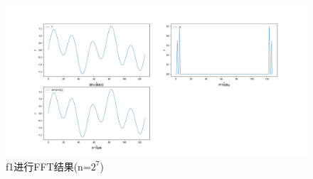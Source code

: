 \documentclass{article}
\begin{document}
	\begin{figure}[!h]
	
	\centering
	\includegraphics[scale=0.4]{f_1_7}
	\caption{\heiti{}f1进行FFT结果(n=$ 2^7 $)}
	\label{fig:4}
\end{figure}
\end{document}
